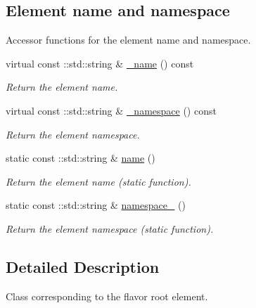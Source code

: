 \subsection*{Element name and namespace}
\label{_amgrpd4b5b61f6e07390f4af2465e04571f34}
Accessor functions for the element name and namespace. \begin{DoxyCompactItemize}
\item 
virtual const ::std::string \& \hyperlink{classopenstack_1_1xml_1_1Flavor___aba88add813895293da5619fc2441f307}{\_\-name} () const 
\begin{DoxyCompactList}\small\item\em Return the element name. \item\end{DoxyCompactList}\item 
virtual const ::std::string \& \hyperlink{classopenstack_1_1xml_1_1Flavor___a4458ef1c616f8fd5d03176e34e9e2f63}{\_\-namespace} () const 
\begin{DoxyCompactList}\small\item\em Return the element namespace. \item\end{DoxyCompactList}\item 
static const ::std::string \& \hyperlink{classopenstack_1_1xml_1_1Flavor___a7da50241c13f2807f1954d633b4dc18a}{name} ()
\begin{DoxyCompactList}\small\item\em Return the element name (static function). \item\end{DoxyCompactList}\item 
static const ::std::string \& \hyperlink{classopenstack_1_1xml_1_1Flavor___a2e37bf2702f8ebfd6d38bb0cba5ce041}{namespace\_\-} ()
\begin{DoxyCompactList}\small\item\em Return the element namespace (static function). \item\end{DoxyCompactList}\end{DoxyCompactItemize}


\subsection{Detailed Description}
Class corresponding to the flavor root element. 

